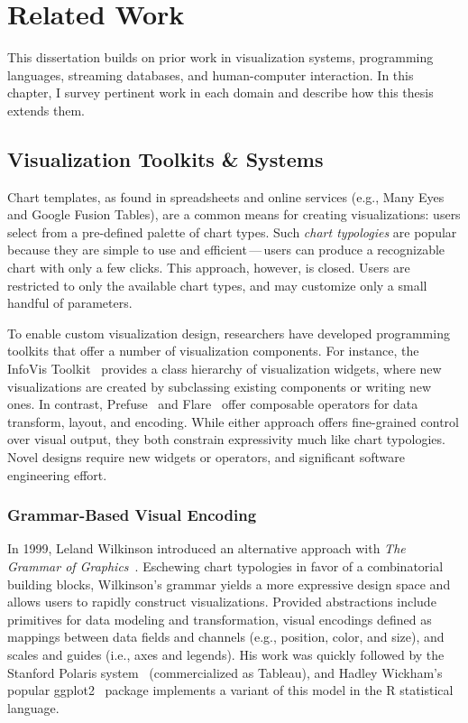 \chapter{Related Work}

This dissertation builds on prior work in visualization systems, programming
languages, streaming databases, and human-computer interaction. In this chapter,
I survey pertinent work in each domain and describe how this thesis extends
them.

\section{Visualization Toolkits \& Systems}

Chart templates, as found in spreadsheets and online services (e.g., Many
Eyes~\cite{ibm:manyeyes} and Google Fusion Tables), are a common means for
creating visualizations: users select from a pre-defined palette of chart types.
Such \emph{chart typologies} are popular because they are simple to use and
efficient\,---\,users can produce a recognizable chart with only a few clicks.
This approach, however, is closed. Users are restricted to only the available
chart types, and may customize only a small handful of parameters.

To enable custom visualization design, researchers have developed programming
toolkits that offer a number of visualization components. For instance, the
InfoVis Toolkit~\cite{fekete:ivtk} provides a class hierarchy of visualization
widgets, where new visualizations are created by subclassing existing components
or writing new ones. In contrast, Prefuse~\cite{heer:prefuse} and
Flare~\cite{flare} offer composable operators for data transform, layout, and
encoding. While either approach offers fine-grained control over visual output,
they both constrain expressivity much like chart typologies. Novel designs
require new widgets or operators, and significant software engineering effort.

\subsection{Grammar-Based Visual Encoding}

In 1999, Leland Wilkinson introduced an alternative approach with \emph{The
Grammar of Graphics}~\cite{wilkinson:grammar}. Eschewing chart typologies in
favor of a combinatorial building blocks, Wilkinson's grammar yields a more
expressive design space and allows users to rapidly construct visualizations.
Provided abstractions include primitives for data modeling and transformation,
visual encodings defined as mappings between data fields and channels (e.g.,
position, color, and size), and scales and guides (i.e., axes and legends). His
work was quickly followed by the Stanford Polaris system~\cite{stolte:polaris}
(commercialized as Tableau), and Hadley Wickham's popular
ggplot2~\cite{wickham:layered} package implements a variant of this model in the
R statistical language.

